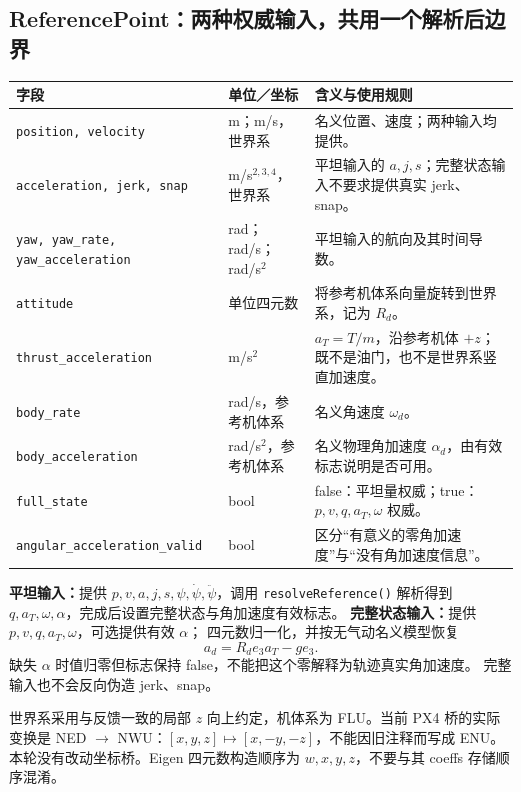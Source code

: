 \documentclass[UTF8,a4paper,11pt,fontset=fandol]{ctexart}
\newcommand{\code}[1]{{\small\nolinkurl{#1}}}
\newcommand{\note}[1]{\par\noindent\colorbox{panel}{\parbox{\dimexpr\linewidth-2\fboxsep}{#1}}\par}
\begin{document}
\subsection{ReferencePoint：两种权威输入，共用一个解析后边界}
\begin{table}[h!]
\small\centering
\begin{tabularx}{\linewidth}{L{4.5cm}L{2.2cm}Y}
\toprule
字段 & 单位／坐标 & 含义与使用规则 \\\midrule
\code{position, velocity} & m；m/s，世界系 & 名义位置、速度；两种输入均提供。\\
\code{acceleration, jerk, snap} & m/s$^{2,3,4}$，世界系 & 平坦输入的 $a,j,s$；完整状态输入不要求提供真实 jerk、snap。\\
\code{yaw, yaw_rate, yaw_acceleration} & rad；rad/s；rad/s$^2$ & 平坦输入的航向及其时间导数。\\
\code{attitude} & 单位四元数 & 将参考机体系向量旋转到世界系，记为 $R_d$。\\
\code{thrust_acceleration} & m/s$^2$ & $a_T=T/m$，沿参考机体 $+z$；既不是油门，也不是世界系竖直加速度。\\
\code{body_rate} & rad/s，参考机体系 & 名义角速度 $\omega_d$。\\
\code{body_acceleration} & rad/s$^2$，参考机体系 & 名义物理角加速度 $\alpha_d$，由有效标志说明是否可用。\\
\code{full_state} & bool & false：平坦量权威；true：$p,v,q,a_T,\omega$ 权威。\\
\code{angular_acceleration_valid} & bool & 区分“有意义的零角加速度”与“没有角加速度信息”。\\
\bottomrule
\end{tabularx}
\end{table}

\textbf{平坦输入：}提供 $p,v,a,j,s,\psi,\dot\psi,\ddot\psi$，调用
\code{resolveReference()} 解析得到 $q,a_T,\omega,\alpha$，完成后设置完整状态与角加速度有效标志。
\textbf{完整状态输入：}提供 $p,v,q,a_T,\omega$，可选提供有效 $\alpha$；
四元数归一化，并按无气动名义模型恢复
\begin{equation} a_d=R_d e_3 a_T-g e_3. \end{equation}
缺失 $\alpha$ 时值归零但标志保持 false，不能把这个零解释为轨迹真实角加速度。
完整输入也不会反向伪造 jerk、snap。

\note{世界系采用与反馈一致的局部 $z$ 向上约定，机体系为 FLU。当前 PX4 桥的实际变换是
NED $\rightarrow$ NWU：$[x,y,z]\mapsto[x,-y,-z]$，不能因旧注释而写成 ENU。
本轮没有改动坐标桥。Eigen 四元数构造顺序为 $w,x,y,z$，不要与其 coeffs 存储顺序混淆。}
\clearpage
\end{document}
